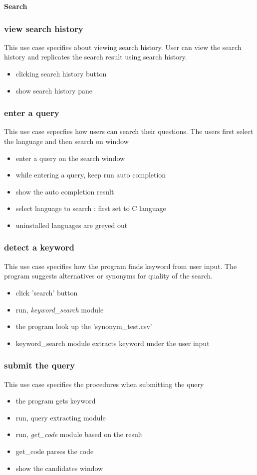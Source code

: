 \documentclass[conference]{IEEEtran}
\begin{document}
\textbf{Search}

\subsubsection{view search history}
This use case specifies about viewing search history. User can view the search history and replicates the search result using search history.
\begin{itemize}
  \item clicking search history button
  \item show search history pane
\end{itemize}
\textit{}


\subsubsection{enter a query}
This use case sepecfies how users can search their questions. The users first select the language and then search on window
\begin{itemize}
  \item enter a query on the search window
  \item while entering a query, keep run auto completion
  \item show the auto completion result
  \item select language to search : first set to C language
  \item uninstalled languages are greyed out
\end{itemize}
\textit{}


\subsubsection{detect a keyword}
This use case specifies how the program finds keyword from user input. The program suggests alternatives or synonyms for quality of the search.
\begin{itemize}
  \item click 'search' button
  \item run, \textit{keyword\_search} module
  \item the program look up the 'synonym_test.csv'
  \item keyword_search module extracts keyword under the user input
\end{itemize}
\textit{}


\subsubsection{submit the query}
This use case specifies the procedures when submitting the query
\begin{itemize}
  \item the program gets keyword
  \item run, query extracting module
  \item run, \textit{get\_code} module based on the result
  \item get_code parses the code
  \item show the candidates window
\end{itemize}
\textit{}
\end{document}
